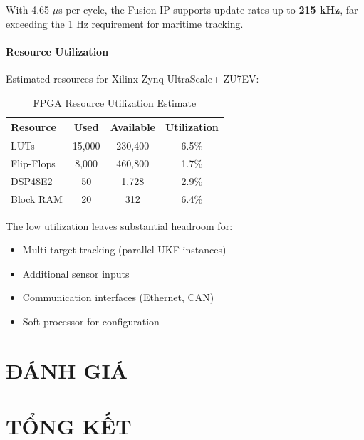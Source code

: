 \documentclass[12pt,a4paper]{report}
\begin{document}
With 4.65 $\mu$s per cycle, the Fusion IP supports update rates up to \textbf{215 kHz}, far exceeding the 1 Hz requirement for maritime tracking.

\subsubsection{Resource Utilization}

Estimated resources for Xilinx Zynq UltraScale+ ZU7EV:

\begin{table}[H]
\centering
\caption{FPGA Resource Utilization Estimate}
\begin{tabular}{|l|c|c|c|}
\hline
\textbf{Resource} & \textbf{Used} & \textbf{Available} & \textbf{Utilization} \\
\hline
LUTs & 15,000 & 230,400 & 6.5\% \\
Flip-Flops & 8,000 & 460,800 & 1.7\% \\
DSP48E2 & 50 & 1,728 & 2.9\% \\
Block RAM & 20 & 312 & 6.4\% \\
\hline
\end{tabular}
\end{table}

The low utilization leaves substantial headroom for:
\begin{itemize}
    \item Multi-target tracking (parallel UKF instances)
    \item Additional sensor inputs
    \item Communication interfaces (Ethernet, CAN)
    \item Soft processor for configuration
\end{itemize}

\chapter{ĐÁNH GIÁ}


\chapter{TỔNG KẾT}

\end{document}
